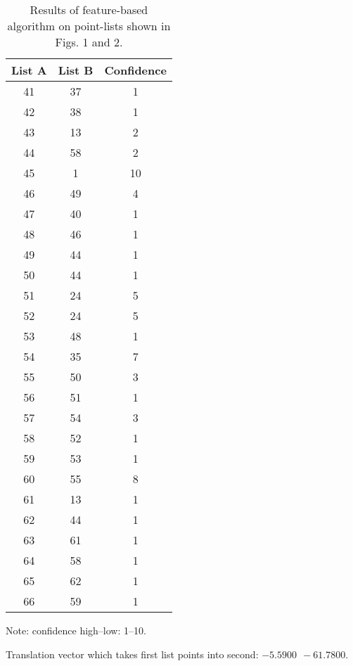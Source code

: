 \newpage

\begin{table}
\begin{center}
\begin{tabular}{c c c} 
List A  & List B & Confidence \\ \hline
 41  &  37  &    1 \\
 42  &  38  &    1 \\
 43  &  13  &    2 \\
 44  &  58  &    2 \\
 45  &   1  &   10 \\
 46  &  49  &    4 \\
 47  &  40  &    1 \\
 48  &  46  &    1 \\
 49  &  44  &    1 \\
 50  &  44  &    1 \\
 51  &  24  &    5 \\
 52  &  24  &    5 \\
 53  &  48  &    1 \\
 54  &  35  &    7 \\
 55  &  50  &    3 \\
 56  &  51  &    1 \\
 57  &  54  &    3 \\
 58  &  52  &    1 \\
 59  &  53  &    1 \\
 60  &  55  &    8 \\
 61  &  13  &    1 \\
 62  &  44  &    1 \\
 63  &  61  &    1 \\
 64  &  58  &    1 \\
 65  &  62  &    1 \\
 66  &  59  &    1 
\end{tabular}

\medskip

Note: confidence high--low: 1--10.

\medskip

Translation vector which takes first list points into second: 
$-5.5900 \ \ -61.7800$.

\medskip

\caption{Results of feature-based algorithm on point-lists shown in Figs. 1 and
2.}

\end{center}
\end{table}

